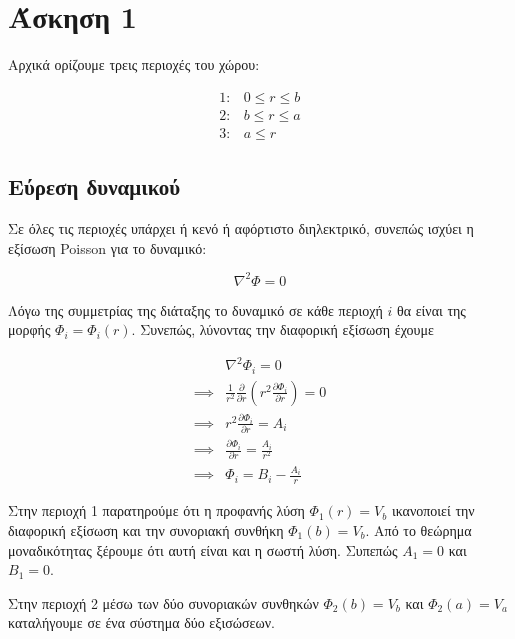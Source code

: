 \section{Άσκηση 1}

Αρχικά ορίζουμε τρεις περιοχές του χώρου:

\begin{equation} \label{eq1}
\begin{split}
  1: & 0 \leq r \leq b \\
  2: & b \leq r \leq a \\
  3: & a \leq r
\end{split}
\end{equation}

\subsection{Εύρεση δυναμικού}

Σε όλες τις περιοχές υπάρχει ή κενό ή αφόρτιστο διηλεκτρικό, συνεπώς ισχύει η
εξίσωση Poisson για το δυναμικό:

\[ \nabla^{2}\Phi = 0 \]

Λόγω της συμμετρίας της διάταξης το δυναμικό σε κάθε περιοχή $i$ θα είναι της
μορφής $\Phi_{i} = \Phi_{i}(r)$. Συνεπώς, λύνοντας την διαφορική εξίσωση έχουμε


\begin{equation} \label{eq1}
\begin{split}
           & \nabla^{2}\Phi_{i} = 0 \\
  \implies & \frac{1}{r^{2}}\frac{\partial}{\partial r}(r^{2}\frac{\partial \Phi_{i}}{\partial r}) = 0 \\
  \implies & r^{2}\frac{\partial \Phi_{i}}{\partial r} = A_{i} \\
  \implies & \frac{\partial \Phi_{i}}{\partial r} = \frac{A_{i}}{r^{2}} \\
  \implies & \Phi_{i} = B_{i} - \frac{A_{i}}{r}
\end{split}
\end{equation}

Στην περιοχή 1 παρατηρούμε ότι η προφανής λύση $\Phi_{1}(r) = V_{b}$ ικανοποιεί
την διαφορική εξίσωση και την συνοριακή συνθήκη $\Phi_{1}(b) = V_{b}$. Από
το θεώρημα μοναδικότητας ξέρουμε ότι αυτή είναι και η σωστή λύση. Συπεπώς
$A_{1} = 0$ και $B_{1} = 0$.

Στην περιοχή 2 μέσω των δύο συνοριακών συνθηκών $\Phi_{2}(b) = V_{b}$ και
$\Phi_{2}(a) = V_{a}$ καταλήγουμε σε ένα σύστημα δύο εξισώσεων.

